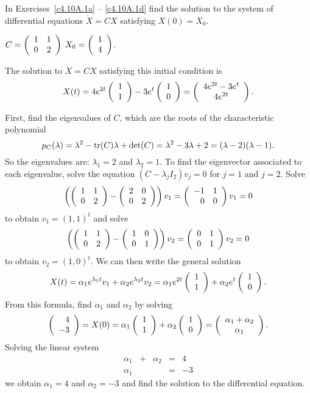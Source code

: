 \documentclass{ximera}
\begin{document}
\TEXER

\noindent In Exercises~\ref{c4.10A.1a} -- \ref{c4.10A.1d} find the solution
to the system of differential equations $\dot{X} = CX$ satisfying $X(0)=X_0$.
\begin{exercise}  \label{c4.10A.1a}
$C = \left(\begin{array}{rr} 1 & 1\\ 0 &2\end{array}\right)$ \AND $X_0 = \left(\begin{array}{r} 1 \\ 4\end{array}\right)$.

\begin{solution}
\ans The solution to $\dot{X} = CX$ satisfying this
initial condition is
\[
X(t) = 4e^{2t}\left(\begin{array}{r} 1 \\ 1\end{array}\right) - 3e^t\left(\begin{array}{r} 1 \\ 0\end{array}\right)
= \left(\begin{array}{c} 4e^{2t} - 3e^t \\ 4e^{2t}\end{array}\right).
\]

\soln First, find the eigenvalues of $C$, which are the roots of the
characteristic polynomial
\[
p_C(\lambda) = \lambda^2 - {\rm tr}(C)\lambda + \det(C) =
\lambda^2 - 3\lambda + 2 = (\lambda - 2)(\lambda - 1).
\]
So the eigenvalues are: $\lambda_1 = 2$ and $\lambda_2 = 1$.
To find the eigenvector associated to each eigenvalue, solve
the equation $(C - \lambda_jI_2)v_j = 0$ for $j = 1$ and $j = 2$.  Solve
\[
\left(\left(\begin{array}{rr} 1 & 1\\ 0 &2\end{array}\right) - \left(\begin{array}{rr} 2 & 0\\ 0 &2\end{array}\right)\right)v_1 =
\left(\begin{array}{rr} -1 & 1\\ 0 &0\end{array}\right)v_1 = 0
\]
to obtain $v_1 = (1,1)^t$ and solve
\[
\left(\left(\begin{array}{rr} 1 & 1\\ 0 &2\end{array}\right) - \left(\begin{array}{rr} 1 & 0\\ 0 &1\end{array}\right)\right)v_2 =
\left(\begin{array}{rr} 0 & 1\\ 0 &1\end{array}\right)v_2 = 0
\]
to obtain $v_2 = (1,0)^t$.  We can then write the general solution
\[
X(t) = \alpha_1e^{\lambda_1 t}v_1 + \alpha_2e^{\lambda_2 t}v_2
= \alpha_1e^{2t}\left(\begin{array}{r} 1 \\ 1\end{array}\right) + \alpha_2e^t\left(\begin{array}{r} 1 \\ 0\end{array}\right).
\]
From this formula, find $\alpha_1$ and $\alpha_2$ by solving
\[
\left(\begin{array}{r} 4 \\ -3\end{array}\right) = X(0) = \alpha_1\left(\begin{array}{r} 1 \\ 1\end{array}\right) + \alpha_2\left(\begin{array}{r} 1 \\ 0\end{array}\right) =
\left(\begin{array}{c} \alpha_1 + \alpha_2 \\ \alpha_1\end{array}\right).
\]
Solving the linear system
\[
\begin{array}{rrrrr}
\alpha_1 & + & \alpha_2 & = & 4 \\
\alpha_1 & & & = & -3
\end{array}
\]
we obtain $\alpha_1 = 4$ and $\alpha_2 = -3$ and find the
solution to the differential equation.


\end{solution}
\end{exercise}
\end{document}
